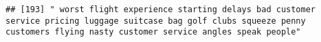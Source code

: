 \documentclass[
]{article}
\begin{document}
\begin{verbatim}
## [193] " worst flight experience starting delays bad customer service pricing luggage suitcase bag golf clubs squeeze penny customers flying nasty customer service angles speak people"                                                                                                                                                                                                                                                                                                                                                                                                                                                                                                                                                                                                                                                                                                                                                                                                                                                                                                                                                                                                                                                                                                                                                                                                                                                                                                                                                                                                                                                                                                                                                                                                               

\end{verbatim}
\end{document}
